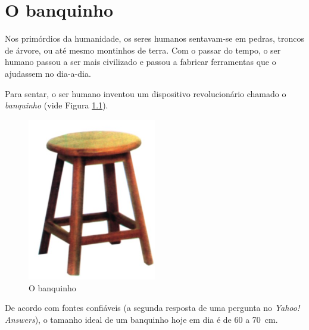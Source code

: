 \chapter{O banquinho}
\label{sec:banquinho}

Nos primórdios da humanidade, os seres humanos sentavam-se em
pedras, troncos de árvore, ou até mesmo montinhos de terra.
Com o passar do tempo, o ser humano passou a ser mais civilizado
e passou a fabricar ferramentas que o ajudassem no dia-a-dia.

Para sentar, o ser humano inventou um dispositivo revolucionário
chamado o \emph{banquinho} (vide Figura \ref{fig:banquinho}).

\begin{figure}[!htb]
  \centering
  \includegraphics[width=0.5\textwidth]{banquinho.jpg}
  \caption{O banquinho}
  \label{fig:banquinho}
\end{figure}

De acordo com fontes confiáveis (a segunda resposta de uma pergunta
no \textit{Yahoo! Answers}), o tamanho ideal de um banquinho hoje em
dia é de 60 a 70~cm.
